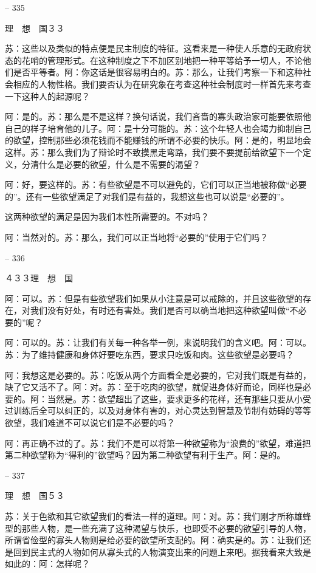 \documentclass[11pt,oneside]{book}
\begin{document}
\begin{common-format}
    

-- 335

    理　想　国３３

    苏：这些以及类似的特点便是民主制度的特征。这看来是一种使人乐意的无政府状态的花哨的管理形式。在这种制度之下不加区别地把一种平等给予一切人，不论他们是否平等者。阿：你这话是很容易明白的。苏：那么，让我们考察一下和这种社会相应的人物性格。我们要否认为在研究象在考查这种社会制度时一样首先来考查一下这种人的起源呢？

    阿：是的。苏：那么是不是这样？换句话说，我们吝啬的寡头政治家可能要依照他自己的样子培育他的儿子。阿：是十分可能的。苏：这个年轻人也会竭力抑制自己的欲望，控制那些必须花钱而不能赚钱的所谓不必要的快乐。阿：是的，明显地会这样。苏：那么我们为了辩论时不致摸黑走弯路，我们要不要提前给欲望下一个定义，分清什么是必要的欲望，什么是不需要的渴望？

    阿：好，要这样的。苏：有些欲望是不可以避免的，它们可以正当地被称做“必要的”。还有一些欲望满足了对我们是有益的，我想这些也可以说是“必要的”。

    这两种欲望的满足是因为我们本性所需要的。不对吗？

    阿：当然对的。苏：那么，我们可以正当地将“必要的”使用于它们吗？

    

-- 336

    ４３３理　想　国

    阿：可以。苏：但是有些欲望我们如果从小注意是可以戒除的，并且这些欲望的存在，对我们没有好处，有时还有害处。我们是否可以确当地把这种欲望叫做“不必要的”呢？

    阿：可以的。苏：让我们有关每一种各举一例，来说明我们的含义吧。阿：可以。苏：为了维持健康和身体好要吃东西，要求只吃饭和肉。这些欲望是必要吗？

    阿：我想这是必要的。苏：吃饭从两个方面看全是必要的，它对我们既是有益的，缺了它又活不了。阿：对。苏：至于吃肉的欲望，就促进身体好而论，同样也是必要的。阿：当然是。苏：欲望超出了这些，要求更多的花样，还有那些只要从小受过训练后全可以纠正的，以及对身体有害的，对心灵达到智慧及节制有妨碍的等等欲望，我们难道不可以说它们是不必要的吗？

    阿：再正确不过的了。苏：我们不是可以将第一种欲望称为“浪费的”欲望，难道把第二种欲望称为“得利的”欲望吗？因为第二种欲望有利于生产。阿：是的。

    

-- 337

    理　想　国５３

    苏：关于色欲和其它欲望我们的看法一样的道理。阿：对。苏：我们刚才所称雄蜂型的那些人物，是一些充满了这种渴望与快乐，也即受不必要的欲望引导的人物，所谓省俭型的寡头人物则是给必要的欲望所支配的。阿：确实是的。苏：让我们还是回到民主式的人物如何从寡头式的人物演变出来的问题上来吧。据我看来大致是如此的：阿：怎样呢？


\end{common-format}
\end{document}
